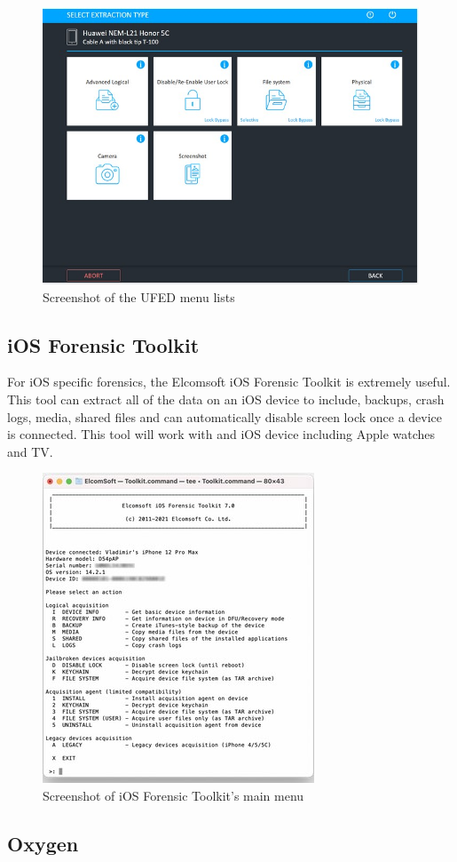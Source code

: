 \documentclass[acmlarge]{style/acmart}
\begin{document}
\begin{figure}[H]
  \centering
  \includegraphics[width=0.5\linewidth]{imgs/ufed.jpg}
  \caption{Screenshot of the UFED menu lists}
  \label{fig:ufed}
\end{figure}

\subsection{iOS Forensic Toolkit}

For iOS specific forensics, the Elcomsoft iOS Forensic Toolkit is extremely useful. This tool can extract all of the data on an iOS device to include, backups, crash logs, media, shared files and can automatically disable screen lock once a device is connected. This tool will work with and iOS device including Apple watches and TV. %

\begin{figure}[H]
  \centering
  \includegraphics[width=0.5\linewidth]{imgs/ftk.jpg}
  \caption{Screenshot of iOS Forensic Toolkit’s main menu}
  \label{fig:ftk}
\end{figure}

\subsection{Oxygen}
\end{document}

